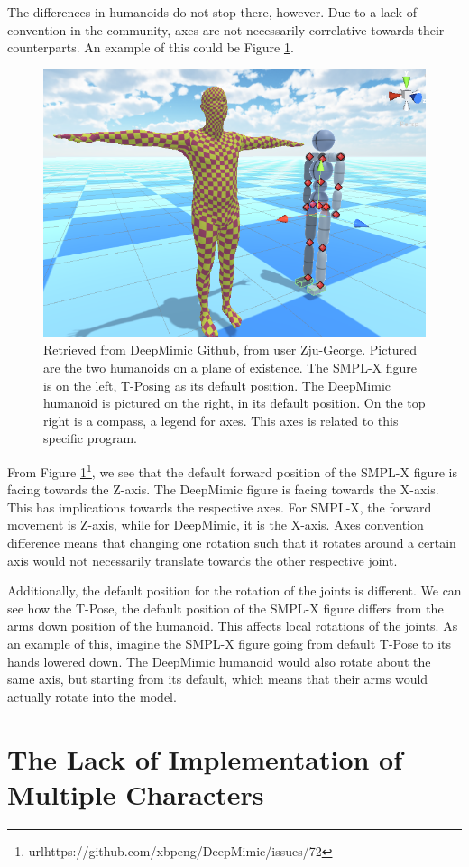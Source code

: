 \documentclass{l4proj}
\begin{document}
The differences in humanoids do not stop there, however. Due to a lack of convention in the community, axes are not necessarily correlative towards their counterparts. An example of this could be Figure \ref{fig:humanoids_in_program}.

\begin{figure}[htb]
  \centering
  \includegraphics[width = 0.5\linewidth]{images/humanoids_in_program.png}
  
  \caption{Retrieved from DeepMimic Github, from user Zju-George. Pictured are the two humanoids on a plane of existence. The SMPL-X figure is on the left, T-Posing as its default position. The DeepMimic humanoid is pictured on the right, in its default position. On the top right is a compass, a legend for axes. This axes is related to this specific program.}
  
  \label{fig:humanoids_in_program}
\end{figure}

From Figure \ref{fig:humanoids_in_program}\footnote{url{https://github.com/xbpeng/DeepMimic/issues/72}}, we see that the default forward position of the SMPL-X figure is facing towards the Z-axis. The DeepMimic figure is facing towards the X-axis. This has implications towards the respective axes. For SMPL-X, the forward movement is Z-axis, while for DeepMimic, it is the X-axis. Axes convention difference means that changing one rotation such that it rotates around a certain axis would not necessarily translate towards the other respective joint.

Additionally, the default position for the rotation of the joints is different. We can see how the T-Pose, the default position of the SMPL-X figure differs from the arms down position of the humanoid. This affects local rotations of the joints. As an example of this, imagine the SMPL-X figure going from default T-Pose to its hands lowered down. The DeepMimic humanoid would also rotate about the same axis, but starting from its default, which means that their arms would actually rotate into the model.
\clearpage
\section{The Lack of Implementation of Multiple Characters}
\end{document}
